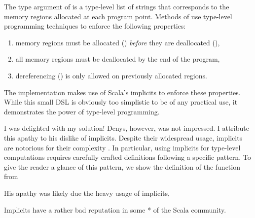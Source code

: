 \memImplicitMainCodeSection

\noindent
The type argument of  is a type-level list of strings that corresponds to the memory regions allocated at each program point.
Methods of  use type-level programming techniques to enforce the following properties:

\begin{enumerate}
  \item memory regions must be allocated () \emph{before} they are deallocated (),
  \item all memory regions must be deallocated by the end of the program,
  \item dereferencing () is only allowed on previously allocated regions.
\end{enumerate}

\noindent
The implementation makes use of Scala's implicits to enforce these properties.
While this small DSL is obviously too simplistic to be of any practical use, it demonstrates the power of type-level programming.

I was delighted with my solution!
Denys, however, was not impressed.
I attribute this apathy to his dislike of implicits.
Despite their widespread usage, implicits are notorious for their complexity \citep{filip2019implicits}.
In particular, using implicits for type-level computations requires carefully crafted definitions following a specific pattern.
To give the reader a glance of this pattern, we show the definition of the  function from

\memImplicitContextCodeSection

\memImplicitRemoveCodeSection





His apathy was likely due the heavy usage of implicits,

Implicits have a rather bad reputation in some * of the Scala community.


